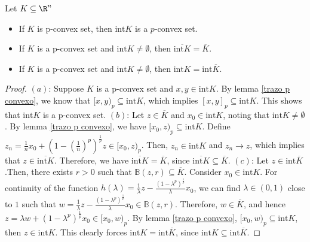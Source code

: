 \documentclass[10pt]{article}
\begin{document}
\begin{theorem} Let $K\subseteq \R^{n}$
\begin{itemize}
\item [$(a)$] If $K$ is p-convex set, then $\mathrm{int} K$ is a $p$-convex set.
\item [$(b)$] If $K$ is a p-convex set and  $\mathrm{int} K\neq \emptyset$, then $\overline{\mathrm{int} K}=\overline{K}$.
\item [$(c)$]If $K$ is a p-convex set and  $\mathrm{int} K\neq \emptyset$, then $\mathrm{int} K=\mathrm{int} \overline{K}$.
\end{itemize}
\end{theorem}
\begin{proof}
$(a)$: Suppose $K$ is a p-convex set and $x,y\in \mathrm{int} K$. By lemma \ref{trazo p convexo}, we know that  $[x,y)_{p}\subseteq \mathrm{int} K$, which implies $[x,y]_{p}\subseteq \mathrm{int} K$. This shows that $\mathrm{int} K$ is a p-convex set. $(b)$: Let $z\in\overline{K}$ and $x_{0}\in \mathrm{int} K$, noting that $\mathrm{int} K\neq \emptyset$. By lemma \ref{trazo p convexo}, we have $[x_{0},z)_{p}\subseteq \mathrm{int} K$. Define $\displaystyle z_{n}=\frac{1}{n}x_{0}+\left(1-\left(\frac{1}{n}\right)^{p}\right)^{\frac{1}{p}}z\in[x_{0},z)_{p}$. Then, $z_{n}\in \mathrm{int} K$ and $z_{n}\to z$, which implies that  $z\in \overline{\mathrm{int} K}$. Therefore, we have $\overline{\mathrm{int} K}=\overline{K}$, since $\overline{\mathrm{int} K}\subseteq\overline{K}$. $(c)$: Let $z\in \mathrm{int} \overline{K}$.Then, there exists $r>0$ such that $\mathbb{B}(z,r)\subseteq \overline{K}$. Consider $x_{0}\in \mathrm{int} K$. For continuity of the function $h(\lambda)=\frac{1}{\lambda}z-\frac{(1-\lambda^{p})^{\frac{1}{p}}}{\lambda}x_{0}$, we can find $\lambda\in (0,1)$ close to $1$ such that $w=\frac{1}{\lambda}z-\frac{(1-\lambda^{p})^{\frac{1}{p}}}{\lambda}x_{0} \in \mathbb{B}(z,r)$. Therefore, $w\in \overline{K}$,  and hence $z=\lambda w+(1-\lambda^{p})^{\frac{1}{p}}x_{0}\in [x_{0},w)_{p}$. By lemma \ref{trazo p convexo}, $[x_{0},w)_{p}\subseteq \mathrm{int} K$, then $z\in \mathrm{int} K$. This clearly forces $\mathrm{int} K=\mathrm{int} \overline{K}$, since $\mathrm{int} K\subseteq\mathrm{int} \overline{K}$.
\end{proof}
\end{document}
